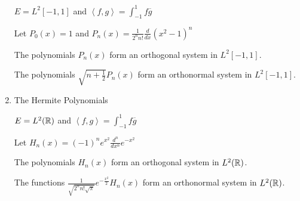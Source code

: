 \documentclass[letterpaper,12pt,fleqn]{article}
\newcommand{\inner}[1]{\left<#1\right>}
\newcommand{\conj}[1]{\overline{#1}}
\begin{document}
\begin{examples}
\begin{enumerate}
    $E=L^2[-1,1]$ and $\inner{f,g}=\int_{-1}^1f\conj{g}$

    Let $P_0(x)=1$ and $P_n(x)=\frac{1}{2^nn!}\frac{d}{dx}(x^2-1)^n$

    The polynomials $P_n(x)$ form an orthogonal system in $L^2[-1,1]$.
    
    The polynomials $\sqrt{n+\frac{1}{2}}P_n(x)$ form an orthonormal system
    in $L^2[-1,1]$.

  \item The Hermite Polynomials

    $E=L^2(\mathbb{R})$ and $\inner{f,g}=\int_{-1}^1f\conj{g}$

    Let $H_n(x)=(-1)^ne^{x^2}\frac{d^n}{dx^n}e^{-x^2}$

    The polynomials $H_n(x)$ form an orthogonal system in $L^2(\mathbb{R})$.

    The functions $\frac{1}{\sqrt{2^nn!\sqrt{\pi}}}e^{-\frac{x^2}{2}}H_n(x)$ form
    an orthonormal system in $L^2(\mathbb{R})$.
  \end{enumerate}
\end{examples}
\end{document}
